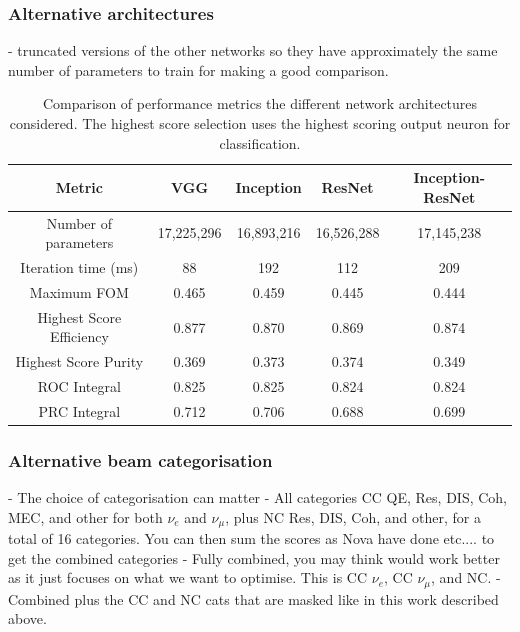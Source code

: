 \subsubsection*{Alternative architectures} %

- truncated versions of the other networks so they have approximately the same number of
parameters to train for making a good comparison.

\begin{table}
    \begin{tabular}{ccccc}
        Metric                   & VGG        & Inception  & ResNet     & Inception-ResNet \\
        \midrule
        Number of parameters     & 17,225,296 & 16,893,216 & 16,526,288 & 17,145,238       \\
        Iteration time (ms)      & 88         & 192        & 112        & 209              \\
        Maximum FOM              & 0.465      & 0.459      & 0.445      & 0.444            \\
        Highest Score Efficiency & 0.877      & 0.870      & 0.869      & 0.874            \\
        Highest Score Purity     & 0.369      & 0.373      & 0.374      & 0.349            \\
        ROC Integral             & 0.825      & 0.825      & 0.824      & 0.824            \\
        PRC Integral             & 0.712      & 0.706      & 0.688      & 0.699            \\
    \end{tabular}
    \caption[Comparison of performance metrics for the different network architectures considered.]
    {Comparison of performance metrics the different network architectures considered. The highest
        score selection uses the highest scoring output neuron for classification.}
    \label{tab:arch}
\end{table}

\subsubsection*{Alternative beam categorisation} %

- The choice of categorisation can matter
- All categories CC QE, Res, DIS, Coh, MEC, and other for both $\nu_{e}$ and $\nu_{\mu}$, plus NC
Res, DIS, Coh, and other, for a total of 16 categories. You can then sum the scores as Nova have
done etc.... to get the combined categories
- Fully combined, you may think would work better as it just focuses on what we want to optimise.
This is CC $\nu_{e}$, CC $\nu_{\mu}$, and NC.
- Combined plus the CC and NC cats that are masked like in this work described above.

